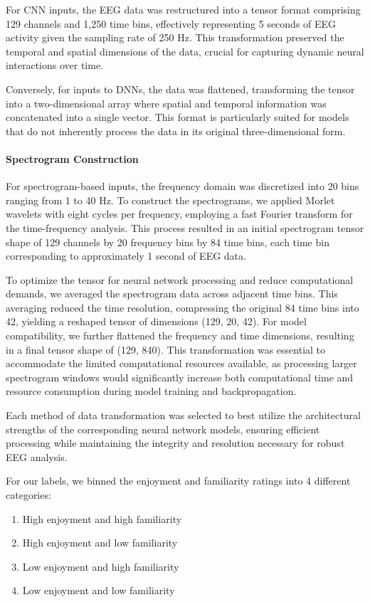 \documentclass[fleqn,10pt]{SelfArx} %
\begin{document}
For CNN inputs, the EEG data was restructured into a tensor format comprising 129 channels and 1,250 time bins, effectively representing 5 seconds of EEG activity given the sampling rate of 250 Hz. This transformation preserved the temporal and spatial dimensions of the data, crucial for capturing dynamic neural interactions over time.

Conversely, for inputs to DNNs, the data was flattened, transforming the tensor into a two-dimensional array where spatial and temporal information was concatenated into a single vector. This format is particularly suited for models that do not inherently process the data in its original three-dimensional form.

\paragraph{Spectrogram Construction}
For spectrogram-based inputs, the frequency domain was discretized into 20 bins ranging from 1 to 40 Hz. To construct the spectrograms, we applied Morlet wavelets with eight cycles per frequency, employing a fast Fourier transform for the time-frequency analysis. This process resulted in an initial spectrogram tensor shape of 129 channels by 20 frequency bins by 84 time bins, each time bin corresponding to approximately 1 second of EEG data.

To optimize the tensor for neural network processing and reduce computational demands, we averaged the spectrogram data across adjacent time bins. This averaging reduced the time resolution, compressing the original 84 time bins into 42, yielding a reshaped tensor of dimensions (129, 20, 42). For model compatibility, we further flattened the frequency and time dimensions, resulting in a final tensor shape of (129, 840). This transformation was essential to accommodate the limited computational resources available, as processing larger spectrogram windows would significantly increase both computational time and resource consumption during model training and backpropagation.

Each method of data transformation was selected to best utilize the architectural strengths of the corresponding neural network models, ensuring efficient processing while maintaining the integrity and resolution necessary for robust EEG analysis.

For our labels, we binned the enjoyment and familiarity ratings into 4 different categories:
\begin{enumerate}
    \item High enjoyment and high familiarity
    \item High enjoyment and low familiarity
    \item Low enjoyment and high familiarity
    \item Low enjoyment and low familiarity
\end{enumerate}
\end{document}
